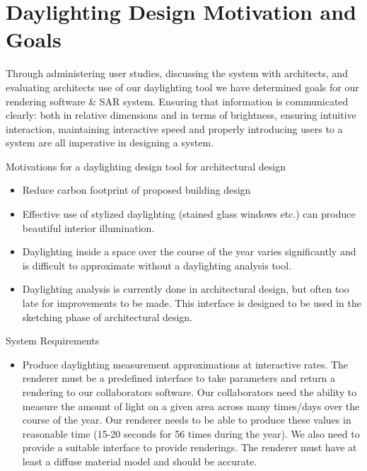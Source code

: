 \chapter{Daylighting Design Motivation and Goals}


Through administering user studies, discussing the system with architects, and evaluating architects use of our daylighting tool we have determined goals for our rendering software \& SAR system.  Ensuring that information is communicated clearly: both in relative dimensions and in terms of brightness, ensuring intuitive interaction, maintaining interactive speed and properly introducing users to a system are all imperative in designing a system.  


Motivations for a daylighting design tool for architectural design  

\begin{itemize}
\item    Reduce carbon footprint of proposed building design
\item    Effective use of stylized daylighting (stained glass windows etc.) can produce beautiful interior illumination.
\item    Daylighting inside a space over the course of the year varies significantly and is difficult to approximate without a daylighting analysis tool.
\item    Daylighting analysis is currently done in architectural design, but often too late for improvements to be made.  This interface is designed to be used in the sketching phase of architectural design.
\end{itemize}

System Requirements     

\begin{itemize}
\item    Produce daylighting measurement approximations at interactive rates.  The renderer must be a predefined interface to take parameters and return a rendering to our collaborators software.  Our collaborators need the ability to measure the amount of light on a given area across many times/days over the course of the year.  Our renderer needs to be able to produce these values in reasonable time (15-20 seconds for 56 times during the year).  We also need to provide a suitable interface to provide renderings. The renderer must have at least a diffuse material model and should be accurate.
\end{itemize}


